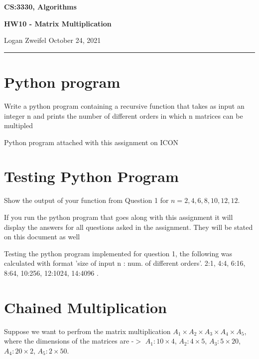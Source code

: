 \documentclass[11pt]{article}
\begin{document}
\thispagestyle{empty}

\begin{center}
\bf\large CS:3330, Algorithms
\end{center}

\begin{center}
\bf\large HW10 - Matrix Multiplication  %
\end{center}

\noindent
Logan Zweifel     %
\hfill
October 24, 2021           %

\noindent
\rule{\textwidth}{1pt}

\medskip



\section{Python program}
Write a python program containing a recursive function that takes as input an integer n and prints the number of different orders in which n matrices can be multipled

\bigskip
\bigskip

\noindent Python program attached with this assignment on ICON

\section{Testing Python Program}
Show the output of your function from Question 1 for $n = 2, 4, 6, 8, 10, 12, 12$.

\bigskip
\bigskip

\noindent If you run the python program that goes along with this assignment it will display the answers for all questions asked in the assignment. They will be stated on this document as well

\bigskip
\bigskip

Testing the python program implemented for question 1, the following was calculated with format 'size of input n : num. of different orders'. 2:1, 4:4, 6:16, 8:64, 10:256, 12:1024, 14:4096 . 


\section{Chained Multiplication}
Suppose we want to perfrom the matrix multiplication $A_1 \times A_2 \times A_3 \times A_4 \times A_5$, where the dimensions of the matrices are -$>$  $A_1: 10 \times 4$, $A_2: 4 \times 5$, $A_3: 5 \times 20$, $A_4: 20 \times 2$, $A_5: 2 \times 50$. \\
\end{document}
